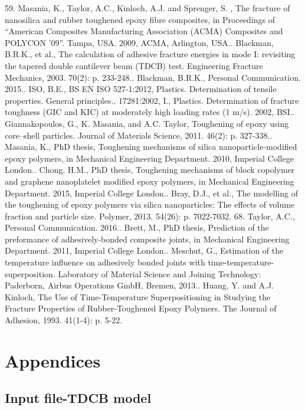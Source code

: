 \documentclass[numbers=noendperiod,chapterprefix=on]{icldt} %
\begin{document}
59.	Masania, K., Taylor, A.C., Kinloch, A.J. and Sprenger, S. , The fracture of nanosilica and rubber toughened epoxy fibre composites, in Proceedings of “American Composites Manufacturing Association (ACMA) Composites and POLYCON ’09”. Tampa, USA. 2009, ACMA, Arlington, USA..	Blackman, B.R.K., et al., The calculation of adhesive fracture energies in mode I: revisiting the tapered double cantilever beam (TDCB) test. Engineering Fracture Mechanics, 2003. 70(2): p. 233-248..	Blackman, B.R.K., Personal Communication. 2015..	ISO, B.E., BS EN ISO 527-1:2012, Plastics. Determination of tensile properties. General principles..	17281:2002, I., Plastics. Determination of fracture toughness (GIC and KIC) at moderately high loading rates (1 m/s). 2002, BSI..	Giannakopoulos, G., K. Masania, and A.C. Taylor, Toughening of epoxy using core–shell particles. Journal of Materials Science, 2011. 46(2): p. 327-338..	Masania, K., PhD thesis, Toughening mechanisms of silica nanoparticle-modified epoxy polymers, in Mechanical Engineering Department. 2010, Imperial College London..	Chong, H.M., PhD thesis, Toughening mechanisms of block copolymer and graphene nanoplatelet modified epoxy polymers, in Mechanical Engineering Department. 2015, Imperial College London..	Bray, D.J., et al., The modelling of the toughening of epoxy polymers via silica nanoparticles: The effects of volume fraction and particle size. Polymer, 2013. 54(26): p. 7022-7032.
68.	Taylor, A.C., Personal Communication. 2016..	Brett, M., PhD thesis, Prediction of the preformance of adhesively-bonded composite joints, in Mechanical Engineering Department. 2011, Imperial College London..	Meschut, G., Estimation of the temperature influence on adhesively bonded joints with time-temperature-superposition. Laboratory of Material Science and Joining Technology: Paderborn, Airbus Operations GmbH, Bremen, 2013..	Huang, Y. and A.J. Kinloch, The Use of Time-Temperature Superpositioning in Studying the Fracture Properties of Rubber-Toughened Epoxy Polymers. The Journal of Adhesion, 1993. 41(1-4): p. 5-22.\newline


\appendix
\chapter{Appendices}

\section{Input file-TDCB model}

\end{document}
